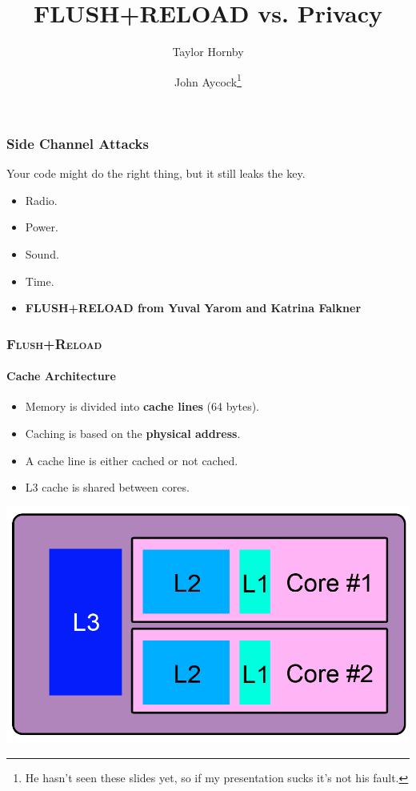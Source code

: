 \documentclass{beamer}
\title{FLUSH+RELOAD vs. Privacy}
\author{Taylor Hornby \and John Aycock\footnote{He hasn't seen these
slides yet, so if my presentation sucks it's not his fault.}}
\begin{document}
    \frame{\titlepage}

\begin{frame}
    \frametitle{Side Channel Attacks}
    Your code might do the right thing, but it still leaks the key.
    \begin{itemize}
        \item Radio.
        \item Power.
        \item Sound.
        \item Time.
        \item \textbf{FLUSH+RELOAD from Yuval Yarom and Katrina Falkner}
    \end{itemize}
\end{frame}


\begin{frame}
    \frametitle{\textsc{Flush+Reload}}
    \framesubtitle{Cache Architecture}

    \begin{itemize}
        \item Memory is divided into \textbf{cache lines} (64 bytes).
        \item Caching is based on the \textbf{physical address}.
        \item A cache line is either cached or not cached.
        \item L3 cache is shared between cores.
    \end{itemize}

    \begin{center}
        \includegraphics{cachearch.png}
    \end{center}

\end{frame}
\end{document}
